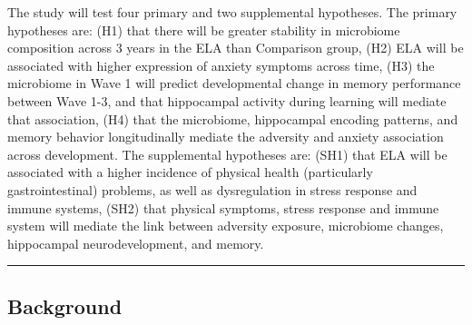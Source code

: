 \documentclass[
]{book}
\begin{document}
The study will test four primary and two supplemental hypotheses. The primary hypotheses are: (H1) that there will be greater stability in microbiome composition across 3 years in the ELA than Comparison group, (H2) ELA will be associated with higher expression of anxiety symptoms across time, (H3) the microbiome in Wave 1 will predict developmental change in memory performance between Wave 1-3, and that hippocampal activity during learning will mediate that association, (H4) that the microbiome, hippocampal encoding patterns, and memory behavior longitudinally mediate the adversity and anxiety association across development. The supplemental hypotheses are: (SH1) that ELA will be associated with a higher incidence of physical health (particularly gastrointestinal) problems, as well as dysregulation in stress response and immune systems, (SH2) that physical symptoms, stress response and immune system will mediate the link between adversity exposure, microbiome changes, hippocampal neurodevelopment, and memory.

\begin{center}\rule{0.5\linewidth}{0.5pt}\end{center}

\hypertarget{background}{%
\subsection{Background}\label{background}}
\end{document}
